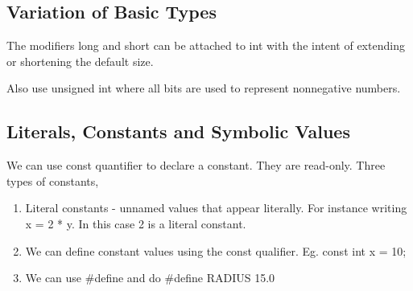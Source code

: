 \subsection{Variation of Basic Types}
The modifiers long and short can be attached to int with the intent of extending or shortening the default size.

Also use unsigned int where all bits are used to represent nonnegative numbers.

\subsection{Literals, Constants and Symbolic Values}
We can use const quantifier to declare a constant. They are read-only. Three types of constants,
\begin{enumerate}
    \item Literal constants - unnamed values that appear literally. For instance writing x = 2 * y. In this case 2 is a literal constant.
    \item We can define constant values using the const qualifier. Eg. const int x = 10;
    \item We can use \#define and do \#define RADIUS 15.0
\end{enumerate}




